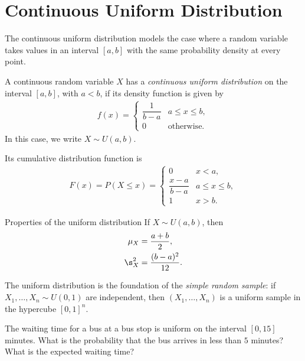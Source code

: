 \section{Continuous Uniform Distribution}

The continuous uniform distribution models the case where a random variable takes values in an interval $[a,b]$ with the same probability density at every point.

\begin{definicion}
A continuous random variable $X$ has a \emph{continuous uniform distribution} on the interval $[a,b]$, with $a<b$, if its density function is given by
\begin{align}
 \label{eq:2.8.1}
 f(x) =
 \begin{cases}
  \dfrac{1}{b-a} & a \leq x \leq b, \\
  0 & \text{otherwise.}
 \end{cases}
\end{align}
In this case, we write $X \sim U(a,b)$.
\end{definicion}

Its cumulative distribution function is
\begin{align}
 \label{eq:2.8.2}
 F(x) = P(X \leq x) =
 \begin{cases}
  0 & x < a, \\
  \dfrac{x-a}{b-a} & a \leq x \leq b, \\
  1 & x > b.
 \end{cases}
\end{align}

{Properties of the uniform distribution} If $X \sim U(a,b)$, then
\begin{align}
 \mu_X &= \frac{a+b}{2}, \\
 \s_X^2 &= \frac{(b-a)^2}{12}.
\end{align}

\begin{observacion}
The uniform distribution is the foundation of the \emph{simple random sample}: if $X_1,\dots,X_n \sim U(0,1)$ are independent, then $(X_1,\dots,X_n)$ is a uniform sample in the hypercube $[0,1]^n$.
\end{observacion}

\begin{ejemplo}
 \label{exmp:2.8.1}
The waiting time for a bus at a bus stop is uniform on the interval $[0,15]$ minutes. What is the probability that the bus arrives in less than $5$ minutes? What is the expected waiting time?
\end{ejemplo}

